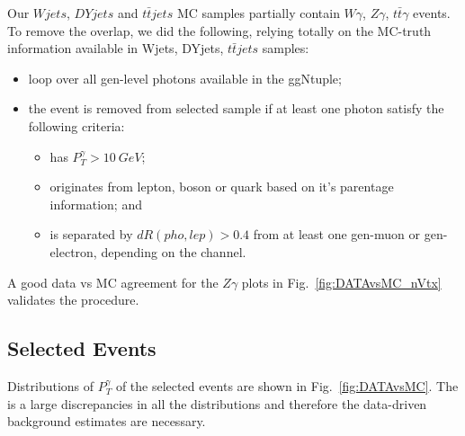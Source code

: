 Our $Wjets$, $DYjets$ and $t\bar{t}jets$ MC samples partially contain $W\gamma$, $Z\gamma$, $t\bar{t}\gamma$ events. To remove the overlap, we did the following, relying totally on the MC-truth information available in Wjets, DYjets, $t\bar{t}jets$ samples:
\begin{itemize}
  \item loop over all gen-level photons available in the ggNtuple;
  \item the event is removed from selected sample if at least one photon satisfy the following criteria:
  \begin{itemize}
     \item has $P_T^{\gamma}>10~GeV$;
     \item originates from lepton, boson or quark based on it's parentage information; and
     \item is separated by $dR(pho,lep)>0.4$ from at least one gen-muon or gen-electron, depending on the channel.
  \end{itemize}
\end{itemize}

A good data vs MC agreement for the $Z\gamma$ plots in Fig.~\ref{fig:DATAvsMC_nVtx} validates the procedure.

\subsection{Selected Events}


Distributions of $P_T^{\gamma}$ of the selected events are shown in Fig.~\ref{fig:DATAvsMC}. The is a large discrepancies in all the distributions and therefore the data-driven background estimates are necessary.

